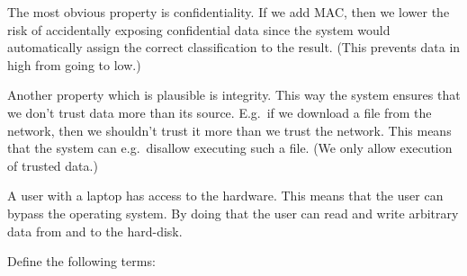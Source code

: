 \documentclass[svv,addpoints]{miunexam}
\begin{document}
\begin{questions}

  \begin{solution}
    The most obvious property is confidentiality.
    If we add MAC, then we lower the risk of accidentally exposing confidential 
    data since the system would automatically assign the correct classification 
    to the result.
    (This prevents data in high from going to low.)

    Another property which is plausible is integrity.
    This way the system ensures that we don't trust data more than its source.
    E.g.\ if we download a file from the network, then we shouldn't trust it 
    more than we trust the network.
    This means that the system can e.g.\ disallow executing such a file.
    (We only allow execution of trusted data.)

    A user with a laptop has access to the hardware.
    This means that the user can bypass the operating system.
    By doing that the user can read and write arbitrary data from and to the 
    hard-disk.
  \end{solution}


  
\question\label{q:foundations:E}
  Define the following terms:
\end{questions}
\end{document}
